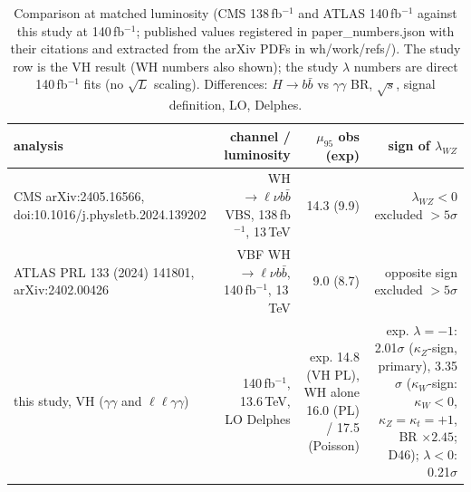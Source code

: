 \begin{table}[ht]\centering\small
\begin{tabular}{lrrr}\hline
analysis & channel / luminosity & $\mu_{95}$ obs (exp) & sign of $\lambda_{WZ}$ \\\hline
CMS arXiv:2405.16566, doi:10.1016/j.physletb.2024.139202 & WH$\to\ell\nu b\bar b$ VBS, 138\,fb$^{-1}$, 13\,TeV & 14.3 (9.9) & $\lambda_{WZ}<0$ excluded $>5\sigma$ \\
ATLAS PRL 133 (2024) 141801, arXiv:2402.00426 & VBF WH$\to\ell\nu b\bar b$, 140\,fb$^{-1}$, 13\,TeV & 9.0 (8.7) & opposite sign excluded $>5\sigma$ \\
this study, VH ($\gamma\gamma$ and $\ell\ell\gamma\gamma$) & 140\,fb$^{-1}$, 13.6\,TeV, LO Delphes & exp. 14.8 (VH PL), WH alone 16.0 (PL) / 17.5 (Poisson) & exp. $\lambda{=}{-}1$: 2.01$\sigma$ ($\kappa_Z$-sign, primary), 3.35$\sigma$ ($\kappa_W$-sign: $\kappa_W{<}0$, $\kappa_Z{=}\kappa_t{=}{+}1$, BR $\times2.45$; D46); $\lambda{<}0$: 0.21$\sigma$ \\\hline
\end{tabular}
\caption{Comparison at matched luminosity (CMS 138\,fb$^{-1}$ and ATLAS 140\,fb$^{-1}$ against this study at 140\,fb$^{-1}$; published values registered in paper\_numbers.json with their citations and extracted from the arXiv PDFs in wh/work/refs/). The study row is the VH result (WH numbers also shown); the study $\lambda$ numbers are direct 140\,fb$^{-1}$ fits (no $\sqrt L$ scaling). Differences: $H\to b\bar b$ vs $\gamma\gamma$ BR, $\sqrt s$, signal definition, LO, Delphes.}
\end{table}
